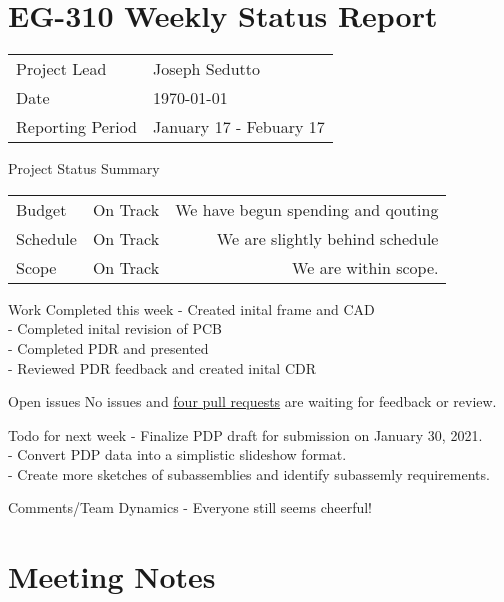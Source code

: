 \documentclass{scrartcl}
\begin{document}
\section*{EG-310 Weekly Status Report}
\begin{center}
    \begin{tabular}{ l l }
        Project Lead     & Joseph Sedutto          \\
        Date             & \today         \\
        Reporting Period & January 17 - Febuary 17
    \end{tabular}
\end{center}

\begin{defi}{Project Status Summary}{}
    \begin{tabular}{ l l r }
        Budget   & On Track & We have begun spending and qouting         \\
        Schedule & On Track & We are slightly behind schedule                     \\
        Scope    & On Track & We are within scope.
    \end{tabular}
\end{defi}

\begin{defi}{Work Completed this week}{}
    - Created inital frame and CAD \\
    - Completed inital revision of PCB \\
    - Completed PDR and presented \\
    - Reviewed PDR feedback and created inital CDR
\end{defi}

\begin{defi}{Open issues}{}
    No issues and \href{https://github.com/KenwoodFox/EG-310-InvertedPendulum/pulls}{four pull requests} are waiting for feedback or review.
\end{defi}

\begin{defi}{Todo for next week}{}
    - Finalize PDP draft for submission on January 30, 2021.  \\ 
    - Convert PDP data into a simplistic slideshow format. \\
    - Create more sketches of subassemblies and identify subassemly requirements.
\end{defi}

\begin{defi}{Comments/Team Dynamics}{}
    - Everyone still seems cheerful!
\end{defi}


\pagebreak
\section{Meeting Notes}

\end{document}
